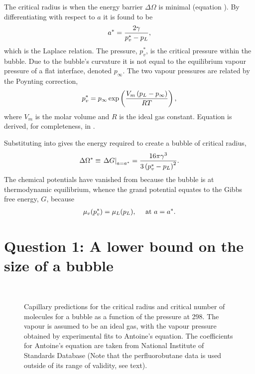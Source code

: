 The critical radius is  when the energy  barrier $\Delta \Omega$ is minimal (equation ).
By differentiating  with respect to $a$ it is found to be
\begin{align}
  {a^\ast} = \frac{2\gamma}{p_v^\ast-p_L}, \label{eqn:LaplaceRelation}
\end{align}
which is the Laplace relation.  The pressure, $p_v^\ast$, is the critical pressure within the bubble.
Due to the bubble's curvature  it is not equal to the equilibrium vapour pressure of a flat interface, 
denoted $p_\infty$. %
The two vapour pressures are related by the Poynting correction, 
\begin{align}
  p_v^\ast = p_\infty \exp \left(  \frac{V_m\left( p_L -p_\infty \right) }{R T}   \right),\label{eqn:PoyntingCorrection}
\end{align}
where $V_m$ is the molar volume  and $R$ is the ideal gas constant.
Equation  is derived, for completeness, in  .

Substituting  into  gives the energy required to create a bubble of  critical radius,
\begin{align}
   \Delta \Omega^\ast \equiv \left.{\Delta G}\right|_{a = {a^\ast}} = \frac{16\pi\gamma^3}{3\left( p_v^\ast- p_L \right)^2}.\label{eqn:DeltaGStar}
\end{align}
The chemical potentials have vanished from  because  the bubble is at thermodynamic equilibrium, 
whence the grand potential equates to the Gibbs free energy, $G$, because
\begin{align}
  \mu_v(p_v^\ast) = \mu_L(p_L),\label{eqn:thermoEqlbm} \quad\text{ at $a = {a^\ast}$.}
\end{align} 



\section{Question 1: A lower bound on the size of a bubble}\label{sec:nuc:evacuate}

\begin{figure}
 \centering 
  \subfloat[]{ \label{fig:cnt:criticalRadius}}\\
  \subfloat[]{\label{fig:cnt:criticalNumber}}
\caption{
    Capillary predictions for the critical radius and critical number of molecules for a bubble as a function of the pressure at \unit{298}\kelvin.  
    The vapour is assumed to be an ideal gas, with the vapour pressure obtained by experimental fits to Antoine's equation.
    The coefficients for Antoine's equation are taken from National Institute of Standards Database\cite{NISTdata}
    (Note that the perfluorobutane data is used outside of its range of validity, see text).
  }
 \label{fig:cnt:nucleation_radius}
\end{figure}

